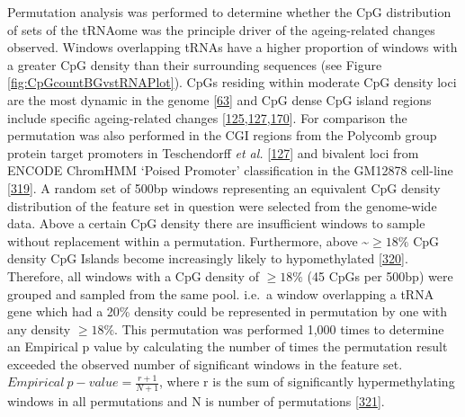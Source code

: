 \documentclass[
]{book}
\begin{document}
Permutation analysis was performed to determine whether the CpG distribution of sets of the tRNAome was the principle driver of the ageing-related changes observed.
Windows overlapping tRNAs have a higher proportion of windows with a greater CpG density than their surrounding sequences (see Figure \ref{fig:CpGcountBGvstRNAPlot}).
CpGs residing within moderate CpG density loci are the most dynamic in the genome {[}\protect\hyperlink{ref-Ziller2013}{63}{]} and CpG dense CpG island regions include specific ageing-related changes {[}\protect\hyperlink{ref-Rakyan2010}{125},\protect\hyperlink{ref-Teschendorff2010}{127},\protect\hyperlink{ref-Bell2016}{170}{]}.
For comparison the permutation was also performed in the CGI regions from the Polycomb group protein target promoters in Teschendorff \emph{et al.} {[}\protect\hyperlink{ref-Teschendorff2010}{127}{]} and bivalent loci from ENCODE ChromHMM `Poised Promoter' classification in the GM12878 cell-line {[}\protect\hyperlink{ref-Ernst2011}{319}{]}.
A random set of 500bp windows representing an equivalent CpG density distribution of the feature set in question were selected from the genome-wide data.
Above a certain CpG density there are insufficient windows to sample without replacement within a permutation.
Furthermore, above \textasciitilde{}\(\ge18\%\) CpG density CpG Islands become increasingly likely to hypomethylated {[}\protect\hyperlink{ref-Bell2012a}{320}{]}.
Therefore, all windows with a CpG density of \(\ge18\%\) (45 CpGs per 500bp) were grouped and sampled from the same pool.
i.e.~a window overlapping a tRNA gene which had a 20\% density could be represented in permutation by one with any density \(\ge18\%\).
This permutation was performed 1,000 times to determine an Empirical p value by calculating the number of times the permutation result exceeded the observed number of significant windows in the feature set.
\(Empirical~p-value = \frac{r+1}{N+1}\), where r is the sum of significantly hypermethylating windows in all permutations and N is number of permutations {[}\protect\hyperlink{ref-North2003}{321}{]}.
\end{document}
